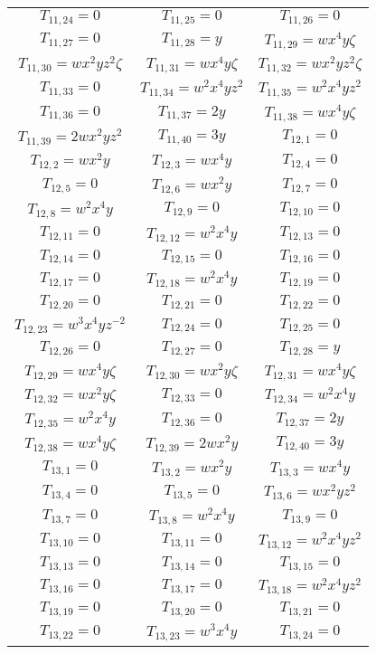 \begin{longtable}{|c|c|c|}
$T_{11,24}= 0$&
$T_{11,25}= 0$&
$T_{11,26}= 0$\\
$T_{11,27}= 0$&
$T_{11,28}= y$&
$T_{11,29}= wx^4y\zeta$\\
$T_{11,30}= wx^2yz^2\zeta$&
$T_{11,31}= wx^4y\zeta$&
$T_{11,32}= wx^2yz^2\zeta$\\
$T_{11,33}= 0$&
$T_{11,34}= w^2x^4yz^2$&
$T_{11,35}= w^2x^4yz^2$\\
$T_{11,36}= 0$&
$T_{11,37}= 2y$&
$T_{11,38}= wx^4y\zeta$\\
$T_{11,39}= 2wx^2yz^2$&
$T_{11,40}= 3y$&
$T_{12,1}= 0$\\
$T_{12,2}= wx^2y$&
$T_{12,3}= wx^4y$&
$T_{12,4}= 0$\\
$T_{12,5}= 0$&
$T_{12,6}= wx^2y$&
$T_{12,7}= 0$\\
$T_{12,8}= w^2x^4y$&
$T_{12,9}= 0$&
$T_{12,10}= 0$\\
$T_{12,11}= 0$&
$T_{12,12}= w^2x^4y$&
$T_{12,13}= 0$\\
$T_{12,14}= 0$&
$T_{12,15}= 0$&
$T_{12,16}= 0$\\
$T_{12,17}= 0$&
$T_{12,18}= w^2x^4y$&
$T_{12,19}= 0$\\
$T_{12,20}= 0$&
$T_{12,21}= 0$&
$T_{12,22}= 0$\\
$T_{12,23}= w^3x^4yz^{-2}$&
$T_{12,24}= 0$&
$T_{12,25}= 0$\\
$T_{12,26}= 0$&
$T_{12,27}= 0$&
$T_{12,28}= y$\\
$T_{12,29}= wx^4y\zeta$&
$T_{12,30}= wx^2y\zeta$&
$T_{12,31}= wx^4y\zeta$\\
$T_{12,32}= wx^2y\zeta$&
$T_{12,33}= 0$&
$T_{12,34}= w^2x^4y$\\
$T_{12,35}= w^2x^4y$&
$T_{12,36}= 0$&
$T_{12,37}= 2y$\\
$T_{12,38}= wx^4y\zeta$&
$T_{12,39}= 2wx^2y$&
$T_{12,40}= 3y$\\
$T_{13,1}= 0$&
$T_{13,2}= wx^2y$&
$T_{13,3}= wx^4y$\\
$T_{13,4}= 0$&
$T_{13,5}= 0$&
$T_{13,6}= wx^2yz^2$\\
$T_{13,7}= 0$&
$T_{13,8}= w^2x^4y$&
$T_{13,9}= 0$\\
$T_{13,10}= 0$&
$T_{13,11}= 0$&
$T_{13,12}= w^2x^4yz^2$\\
$T_{13,13}= 0$&
$T_{13,14}= 0$&
$T_{13,15}= 0$\\
$T_{13,16}= 0$&
$T_{13,17}= 0$&
$T_{13,18}= w^2x^4yz^2$\\
$T_{13,19}= 0$&
$T_{13,20}= 0$&
$T_{13,21}= 0$\\
$T_{13,22}= 0$&
$T_{13,23}= w^3x^4y$&
$T_{13,24}= 0$\\

\end{longtable}

